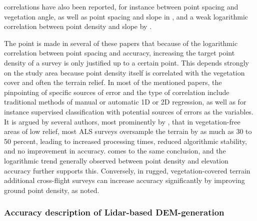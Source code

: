 correlations have also been reported, for instance between point spacing and vegetation angle, as well as point spacing and slope in \cite{peng_shih_2006}, and a weak logarithmic correlation between point density and slope by \cite{chow_hodgson_2009}.

The point is made in several of these papers that because of the logarithmic correlation between point spacing and accuracy, increasing the target point density of a survey is only justified up to a certain point. This depends strongly on the study area because point density itself is correlated with the vegetation cover and often the terrain relief. In most of the mentioned papers, the pinpointing of specific sources of error and the type of correlation include traditional methods of manual or automatic 1D or 2D regression, as well as for instance supervised classification with potential sources of errors as the variables. It is argued by several authors, most prominently by \cite{guo_etal_2010}, that in vegetation-free areas of low relief, most ALS surveys oversample the terrain by as much as 30 to 50 percent, leading to increased processing times, reduced algorithmic stability, and no improvement in accuracy. \cite{bater_coops_2009} comes to the same conclusion, and the logarithmic trend generally observed between point density and elevation accuracy further supports this. Conversely, in rugged, vegetation-covered terrain additional cross-flight surveys can increase accuracy significantly by improving ground point density, as \cite{peng_shih_2006} noted.

\subsubsection*{Accuracy description of Lidar-based DEM-generation}

